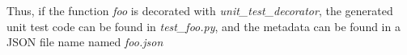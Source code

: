 Thus, if the function \textit{foo} is decorated with \textit{unit\_test\_decorator},
the generated unit test code can be found in \textit{test\_foo.py}, and the 
metadata can be found in a JSON file name named \textit{foo.json}


